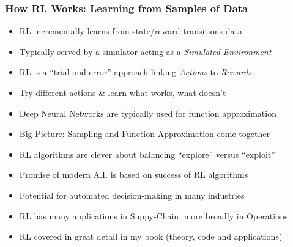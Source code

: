 \documentclass[handout]{beamer}
\begin{document}
\begin{frame}
\frametitle{How RL Works: Learning from Samples of Data}
\pause
\begin{itemize}[<+->]
\item RL incrementally learns from state/reward transitions data
\item Typically served by a simulator acting as a {\em Simulated Environment}
\item RL is a ``trial-and-error'' approach linking {\em Actions} to {\em Rewards}
\item Try different actions \& learn what works, what doesn't
\item Deep Neural Networks are typically used for function approximation
\item Big Picture: Sampling and Function Approximation come together
\item RL algorithms are clever about balancing  ``explore'' versus ``exploit''
\item Promise of modern A.I. is based on success of RL algorithms
\item Potential for automated decision-making in many industries
\item RL has many applications in Suppy-Chain, more broadly in Operations
\item RL covered in great detail in my book (theory, code and applications)
\end{itemize}
\end{frame}
\end{document}
